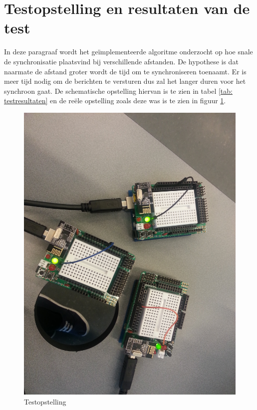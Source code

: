 \documentclass{article}
\begin{document}
\section{Testopstelling en resultaten van de test}
In deze paragraaf wordt het ge\"{i}mplementeerde algoritme onderzocht op hoe snale de synchronisatie plaatsvind bij verschillende afstanden. De hypothese is dat naarmate de afstand groter wordt de tijd om te synchroniseren toenaamt. Er is meer tijd nodig om de berichten te versturen dus zal het langer duren voor het synchroon gaat. De schematische opstelling hiervan is te zien in tabel \ref{tab: testresultaten} en de re\"{e}le opstelling zoals deze was is te zien in figuur \ref{fig: Nodes_tijdens_testen}. 
\begin{figure}[h]
\centering\includegraphics[scale=0.09, angle=90]{Nodes_tijdens_testen}
\caption{Testopstelling}
\label{fig: Nodes_tijdens_testen}
\end{figure}
\end{document}
